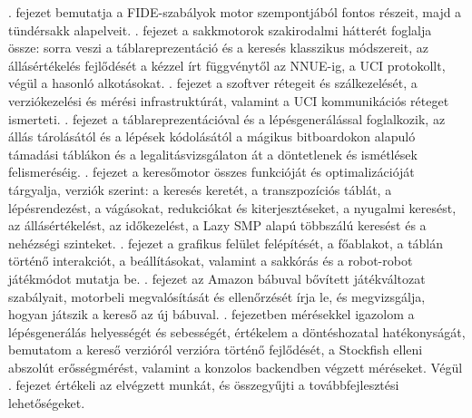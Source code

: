 . fejezet bemutatja a FIDE-szabályok motor szempontjából fontos részeit, majd a tündérsakk alapelveit. . fejezet a sakkmotorok szakirodalmi hátterét foglalja össze: sorra veszi a táblareprezentáció és a keresés klasszikus módszereit, az állásértékelés fejlődését a kézzel írt függvénytől az NNUE-ig, a UCI protokollt, végül a hasonló alkotásokat. . fejezet a szoftver rétegeit és szálkezelését, a verziókezelési és mérési infrastruktúrát, valamint a UCI kommunikációs réteget ismerteti. . fejezet a táblareprezentációval és a lépésgenerálással foglalkozik, az állás tárolásától és a lépések kódolásától a mágikus bitboardokon alapuló támadási táblákon és a legalitásvizsgálaton át a döntetlenek és ismétlések felismeréséig. . fejezet a keresőmotor összes funkcióját és optimalizációját tárgyalja, verziók szerint: a keresés keretét, a transzpozíciós táblát, a lépésrendezést, a vágásokat, redukciókat és kiterjesztéseket, a nyugalmi keresést, az állásértékelést, az időkezelést, a Lazy SMP alapú többszálú keresést és a nehézségi szinteket. . fejezet a grafikus felület felépítését, a főablakot, a táblán történő interakciót, a beállításokat, valamint a sakkórás és a robot-robot játékmódot mutatja be. . fejezet az Amazon bábuval bővített játékváltozat szabályait, motorbeli megvalósítását és ellenőrzését írja le, és megvizsgálja, hogyan játszik a kereső az új bábuval. . fejezetben mérésekkel igazolom a lépésgenerálás helyességét és sebességét, értékelem a döntéshozatal hatékonyságát, bemutatom a kereső verzióról verzióra történő fejlődését, a Stockfish elleni abszolút erősségmérést, valamint a konzolos backendben végzett méréseket. Végül . fejezet értékeli az elvégzett munkát, és összegyűjti a továbbfejlesztési lehetőségeket.
